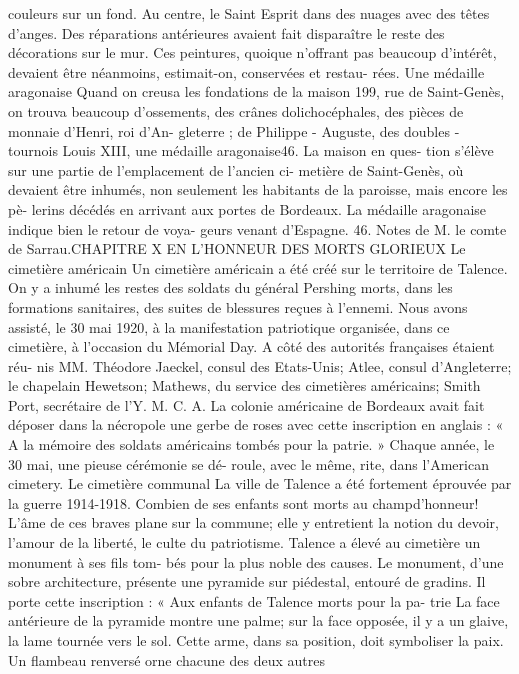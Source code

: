 \documentclass[a4paper,11pt]{book}
\begin{document}
couleurs sur un fond. Au centre, le Saint Esprit dans des
nuages avec des têtes d'anges.
Des réparations antérieures avaient fait disparaître le
reste des décorations sur le mur.
Ces peintures, quoique n'offrant pas beaucoup d'intérêt,
devaient être néanmoins, estimait-on, conservées et restau-
rées.
Une médaille aragonaise
Quand on creusa les fondations de la maison 199, rue de
Saint-Genès, on trouva beaucoup d'ossements, des crânes
dolichocéphales, des pièces de monnaie d'Henri, roi d'An-
gleterre ; de Philippe - Auguste, des doubles - tournois
Louis XIII, une médaille aragonaise46. La maison en ques-
tion s'élève sur une partie de l'emplacement de l'ancien ci-
metière de Saint-Genès, où devaient être inhumés, non
seulement les habitants de la paroisse, mais encore les pè-
lerins décédés en arrivant aux portes de Bordeaux.
La médaille aragonaise indique bien le retour de voya-
geurs venant d'Espagne.
46. Notes de M. le comte de Sarrau.CHAPITRE X
EN L'HONNEUR
DES MORTS GLORIEUX
Le cimetière américain
Un cimetière américain a été créé sur le territoire de
Talence. On y a inhumé les restes des soldats du général
Pershing morts, dans les formations sanitaires, des suites
de blessures reçues à l'ennemi.
Nous avons assisté, le 30 mai 1920, à la manifestation
patriotique organisée, dans ce cimetière, à l'occasion du
Mémorial Day. A côté des autorités françaises étaient réu-
nis MM. Théodore Jaeckel, consul des Etats-Unis; Atlee,
consul d'Angleterre; le chapelain Hewetson; Mathews, du
service des cimetières américains; Smith Port, secrétaire
de l'Y. M. C. A. La colonie américaine de Bordeaux avait
fait déposer dans la nécropole une gerbe de roses avec
cette inscription en anglais : « A la mémoire des soldats
américains tombés pour la patrie. »
Chaque année, le 30 mai, une pieuse cérémonie se dé-
roule, avec le même, rite, dans l'American cimetery.
Le cimetière communal
La ville de Talence a été fortement éprouvée par la guerre
1914-1918. Combien de ses enfants sont morts au champd'honneur! L'âme de ces braves plane sur la commune; elle
y entretient la notion du devoir, l'amour de la liberté, le
culte du patriotisme.
Talence a élevé au cimetière un monument à ses fils tom-
bés pour la plus noble des causes.
Le monument, d'une sobre architecture, présente une
pyramide sur piédestal, entouré de gradins. Il porte cette
inscription : « Aux enfants de Talence morts pour la pa-
trie
La face antérieure de la pyramide montre une palme;
sur la face opposée, il y a un glaive, la lame tournée vers
le sol. Cette arme, dans sa position, doit symboliser la
paix. Un flambeau renversé orne chacune des deux autres
\end{document}

